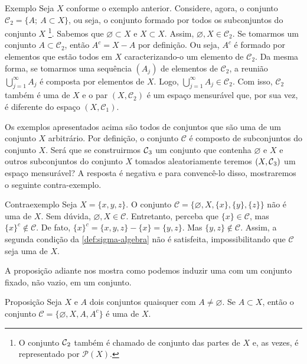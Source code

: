 \begin{env}{Exemplo}
	\label{ex:sigma-subconjuntos}
	Seja $X$ conforme o exemplo anterior.
	Considere, agora, o conjunto \linebreak $\mathcal{C}_2 = \{ A; \ A \subset X\}$, ou seja, o conjunto formado por todos os subconjuntos do conjunto $X$
	\footnote{O conjunto $\operatorname{\mathcal{C}}_2$ também é chamado de conjunto das partes de $X$ e, as vezes, é representado por $\mathcal{P}(X)$.}.
	Sabemos que $\varnothing \subset X$ e $X \subset X$. 
	Assim, $\varnothing, X \in \mathcal{C}_2$. 
	Se tomarmos um conjunto $A \subset \mathcal{C}_2$, então $A^c = X - A$ por definição.
	Ou seja, $A^c$ é formado por elementos que estão todos em $X$ caracterizando-o um elemento de $\mathcal{C}_2$.
	Da mesma forma, se tomarmos uma sequência $(A_j)$ de elementos de $\mathcal{C}_2$, a reunião 
	$\displaystyle \bigcup_{j = 1}^\infty A_j$ é composta por elementos de $X$.
	Logo,  $\displaystyle \bigcup_{j = 1}^\infty A_j \in \mathcal{C}_2$.
	Com isso, $\mathcal{C}_2$ também é uma \sigal de $X$ e o par $(X, \mathcal{C}_2)$ é um espaço mensurável que, por sua vez, é diferente do espaço $(X,\mathcal{C}_1)$.
	\vspace{-0.2cm}
\end{env}

Os exemplos apresentados acima são todos de conjuntos que são uma \sigal de um conjunto $X$ arbitrário.
Por definição, o conjunto $\mathcal{C}$ é composto de subconjuntos do conjunto $X$. 
Será que se construirmos $\operatorname{\mathcal{C}}_3$ um conjunto que contenha $\varnothing$ e $X$ e outros subconjuntos do conjunto $X$ tomados aleatoriamente teremos $(X,\operatorname{\mathcal{C}}_3)$ um espaço mensurável? A resposta é negativa e para convencê-lo disso, mostraremos o seguinte contra-exemplo.

\begin{env}{Contraexemplo}
    Seja $X = \{x,y,z\}$. O conjunto $\mathcal{C} = \{\varnothing, X, \{x\}, \{y\}, \{z\}\}$ não é uma \sigal de $X$.
    Sem dúvida, $\varnothing, X \in \mathcal{C}$. 
    Entretanto, perceba que $\{x\} \in \mathcal{C}$, mas $\{x\}^c \notin \mathcal{C}$.
    De fato, 
    $
    \{x\}^c
    =\{x,y,z\} 
    -\{x\} 
    = \{y,z\}.
    $
    Mas $\{y,z\} \notin \mathcal{C}$.
    Assim, a segunda condição da \ref{def:sigma-algebra} não é satisfeita, impossibilitando que $\mathcal{C}$ seja uma \sigal de $X$.
    \vspace{-0.2cm}
\end{env}

A proposição adiante nos mostra como podemos induzir uma \sigal com um conjunto fixado,  não vazio, em um conjunto.
\begin{env}{Proposição}
\label{prop:sigma-complementar}
    Seja $X$ e $A$ dois conjuntos quaisquer com $A \neq \varnothing$.
    Se $A \subset X$, então o conjunto 
    $\mathcal{C}=\{\varnothing, X, A, A^c\}$ é uma \sigal de $X$.
\end{env}

